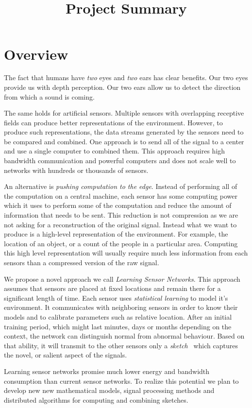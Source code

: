 \documentclass{article}
\title{Project Summary}
\begin{document}
\section{Overview}
The fact that humans have {\em two} eyes and {\em two} ears has clear
benefits. Our two eyes provide us with depth perception. Our two ears
allow us to detect the direction from which a sound is coming.

The same holds for artificial sensors. Multiple sensors with
overlapping receptive fields can produce better representations of the
environment. However, to produce such representations, the data
streams generated by the sensors need to be compared and combined. One
approach is to send all of the signal to a center and use a single
computer to combined them. This approach requires high bandwidth
communication and powerful computers and does not scale well to
networks with hundreds or thousands of sensors.

An alternative is {\em pushing computation to the edge}. Instead of
performing all of the computation on a central machine, each sensor
has some computing power which it uses to perform some of the
computation and reduce the amount of information that needs to be
sent. This reduction is not compression as we are not asking for a
reconstruction of the original signal. Instead what we want to produce
is a high-level representation of the environment. For example, the
location of an object, or a count of the people in a particular
area. Computing this high level representation will usually require
much less information from each sensors than a compressed version of
the raw signal.

We propose a novel approach we call {\em Learning Sensor Networks}.
This approach assumes that sensors are placed at fixed locations and
remain there for a significant length of time.  Each sensor uses {\em
  statistical learning} to model it's environment. It communicates
with neighboring sensors in order to know their models and to
calibrate parameters such as relative location. After an initial
training period, which might last minutes, days or months depending on
the context, the network can distinguish normal from abnormal
behaviour. Based on that ability, it will transmit to the other
sensors only a {\em sketch}~\cite{} which captures the novel, or
salient aspect of the signals.

Learning sensor networks promise much lower energy and bandwidth
consumption than current sensor networks. To realize this potential we
plan to develop new new mathematical models, signal processing methods
and distributed algorithms for computing and combining sketches.
\end{document}
